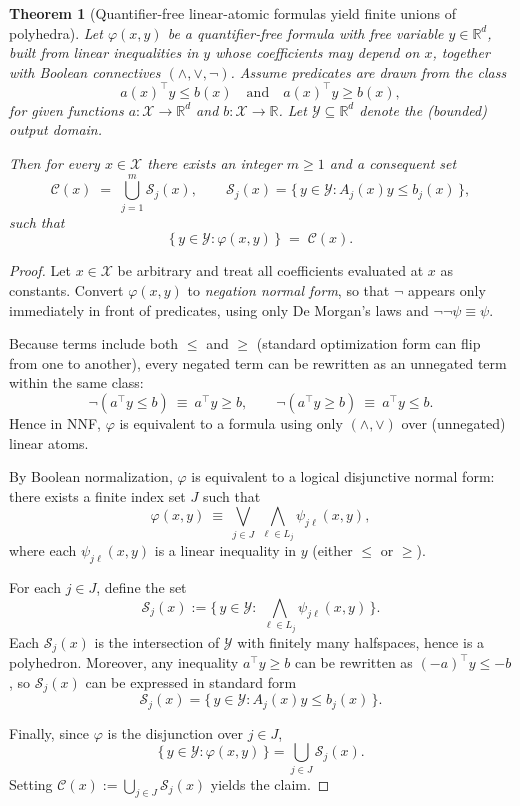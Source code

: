 \documentclass{article}
\theoremstyle{plain}
\newtheorem{theorem}{Theorem}[section]
\theoremstyle{definition}
\theoremstyle{remark}
\begin{document}
\begin{theorem}[Quantifier-free linear-atomic formulas yield finite unions of polyhedra]
\label{thm:qf_subset_app}
Let $\varphi(x,y)$ be a quantifier-free formula with free variable $y\in\mathbb{R}^d$,
built from linear inequalities in $y$ whose coefficients may depend on $x$,
together with Boolean connectives $(\wedge,\vee,\neg)$.
Assume predicates are drawn from the class
\[
a(x)^\top y \le b(x)
\quad\text{and}\quad
a(x)^\top y \ge b(x),
\]
for given functions $a:\mathcal{X}\to\mathbb{R}^d$ and $b:\mathcal{X}\to\mathbb{R}$.
Let $\mathcal{Y}\subseteq\mathbb{R}^d$ denote the (bounded) output domain.

Then for every $x\in\mathcal{X}$ there exists an integer $m\ge 1$ and a consequent set
\[
\mathcal{C}(x) \;=\; \bigcup_{j=1}^m \mathcal{S}_j(x),
\qquad
\mathcal{S}_j(x)=\{\,y\in\mathcal{Y}:A_j(x)y\le b_j(x)\,\},
\]
such that
\[
\{\,y\in\mathcal{Y}:\varphi(x,y)\,\} \;=\; \mathcal{C}(x).
\]
\end{theorem}

\begin{proof}
Let $x\in\mathcal{X}$ be arbitrary and treat all coefficients evaluated at $x$ as constants.
Convert $\varphi(x,y)$ to \emph{negation normal form}, so that $\neg$ appears only
immediately in front of predicates, using only De Morgan's laws and $\neg\neg\psi\equiv\psi$.

Because terms include both $\le$ and $\ge$ (standard optimization form can flip from one to another), every negated term can be rewritten as an unnegated term
within the same class:
\[
\neg(a^\top y \le b)\ \equiv\ a^\top y \ge b,
\qquad
\neg(a^\top y \ge b)\ \equiv\ a^\top y \le b.
\]
Hence in NNF, $\varphi$ is equivalent to a formula using only $(\wedge,\vee)$ over (unnegated) linear atoms.

By Boolean normalization, $\varphi$ is equivalent to a logical disjunctive normal form:
there exists a finite index set $J$ such that
\[
\varphi(x,y)\ \equiv\ \bigvee_{j\in J}\ \bigwedge_{\ell\in L_j}\psi_{j\ell}(x,y),
\]
where each $\psi_{j\ell}(x,y)$ is a linear inequality in $y$ (either $\le$ or $\ge$).

For each $j\in J$, define the set
\[
\mathcal{S}_j(x)
:=
\Big\{\,y\in\mathcal{Y}:\ \bigwedge_{\ell\in L_j}\psi_{j\ell}(x,y)\,\Big\}.
\]
Each $\mathcal{S}_j(x)$ is the intersection of $\mathcal{Y}$ with finitely many halfspaces, hence is a polyhedron.
Moreover, any inequality $a^\top y \ge b$ can be rewritten as $(-a)^\top y \le -b$,
so $\mathcal{S}_j(x)$ can be expressed in standard form
\[
\mathcal{S}_j(x)=\{\,y\in\mathcal{Y}:A_j(x)y\le b_j(x)\,\}.
\]

Finally, since $\varphi$ is the disjunction over $j\in J$,
\[
\{\,y\in\mathcal{Y}:\varphi(x,y)\,\}
=
\bigcup_{j\in J}\mathcal{S}_j(x).
\]
Setting $\mathcal{C}(x):=\bigcup_{j\in J}\mathcal{S}_j(x)$ yields the claim.
\end{proof}
\end{document}
